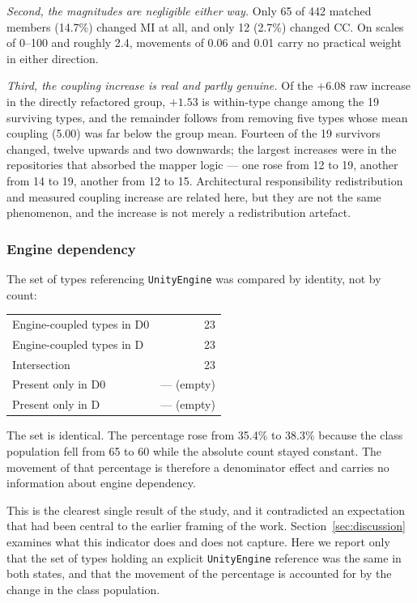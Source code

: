 \documentclass{sbc2019}%
\begin{document}
\emph{Second, the magnitudes are negligible either way.} Only 65 of 442 matched
members (14.7\%) changed MI at all, and only 12 (2.7\%) changed CC\@. On scales of
0--100 and roughly 2.4, movements of 0.06 and 0.01 carry no practical weight in
either direction.

\emph{Third, the coupling increase is real and partly genuine.} Of the $+6.08$
raw increase in the directly refactored group, $+1.53$ is within-type change
among the 19 surviving types, and the remainder follows from removing five types
whose mean coupling (5.00) was far below the group mean. Fourteen of the 19
survivors changed, twelve upwards and two downwards; the largest increases were
in the repositories that absorbed the mapper logic --- one rose from 12 to 19,
another from 14 to 19, another from 12 to 15. Architectural responsibility
redistribution and measured coupling increase are related here, but they are not
the same phenomenon, and the increase is not merely a redistribution artefact.

\subsubsection{Engine dependency}

The set of types referencing \texttt{UnityEngine} was compared by identity, not
by count:

\begin{center}\small
\begin{tabular}{lr}
Engine-coupled types in D0 & 23 \\
Engine-coupled types in D  & 23 \\
Intersection               & 23 \\
Present only in D0         & --- (empty) \\
Present only in D          & --- (empty) \\
\end{tabular}
\end{center}

The set is identical. The percentage rose from 35.4\% to 38.3\% because the
class population fell from 65 to 60 while the absolute count stayed constant.
The movement of that percentage is therefore a denominator effect and carries no
information about engine dependency.

This is the clearest single result of the study, and it contradicted an
expectation that had been central to the earlier framing of the work.
Section~\ref{sec:discussion} examines what this indicator does and does not
capture. Here we report only that the set of types holding an explicit
\texttt{UnityEngine} reference was the same in both states, and that the movement
of the percentage is accounted for by the change in the class population.
\end{document}
